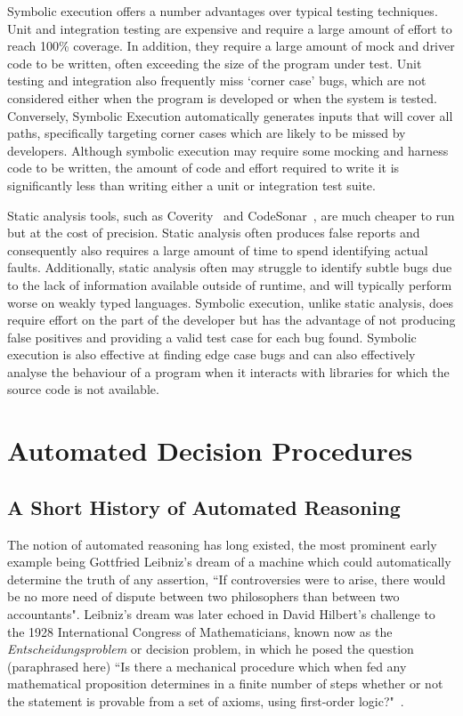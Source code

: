 \documentclass[]{final_report}
\begin{document}
Symbolic execution offers a number advantages over typical testing techniques. Unit and integration testing are expensive and require a large amount of effort to reach 100\% coverage. In addition, they require a large amount of mock and driver code to be written, often exceeding the size of the program under test. Unit testing and integration also frequently miss `corner case' bugs, which are not considered either when the program is developed or when the system is tested. Conversely, Symbolic Execution automatically generates inputs that will cover all paths, specifically targeting corner cases which are likely to be missed by developers. Although symbolic execution may require some mocking and harness code to be written, the amount of code and effort required to write it is significantly less than writing either a unit or integration test suite.

Static analysis tools, such as Coverity~\cite{almossawi2006analysis,Bessey:2010:FBL:1646353.1646374} and CodeSonar~\cite{jetley2008static}, are much cheaper to run but at the cost of precision. Static analysis often produces false reports and consequently also requires a large amount of time to spend identifying actual faults. Additionally, static analysis often may struggle to identify subtle bugs due to the lack of information available outside of runtime, and will typically perform worse on weakly typed languages. Symbolic execution, unlike static analysis, does require effort on the part of the developer but has the advantage of not producing false positives and providing a valid test case for each bug found. Symbolic execution is also effective at finding edge case bugs and can also effectively analyse the behaviour of a program when it interacts with libraries for which the source code is not available.

\chapter{Automated Decision Procedures}

\section{A Short History of Automated Reasoning}
The notion of automated reasoning has long existed, the most prominent early example being Gottfried Leibniz's dream of a machine which could automatically determine the truth of any assertion, ``If controversies were to arise, there would be no more need of dispute between two philosophers than between two accountants". Leibniz's dream was later echoed in David Hilbert's challenge to the 1928 International Congress of Mathematicians, known now as the \textit{Entscheidungsproblem} or decision problem, in which he posed the question (paraphrased here) ``Is there a mechanical procedure which when fed any mathematical proposition determines in a finite number of steps whether or not the statement is provable from a set of axioms, using first-order logic?"~\cite{smtwheredowegofromhere, automatedreasoningbooklet2004}.
\end{document}
